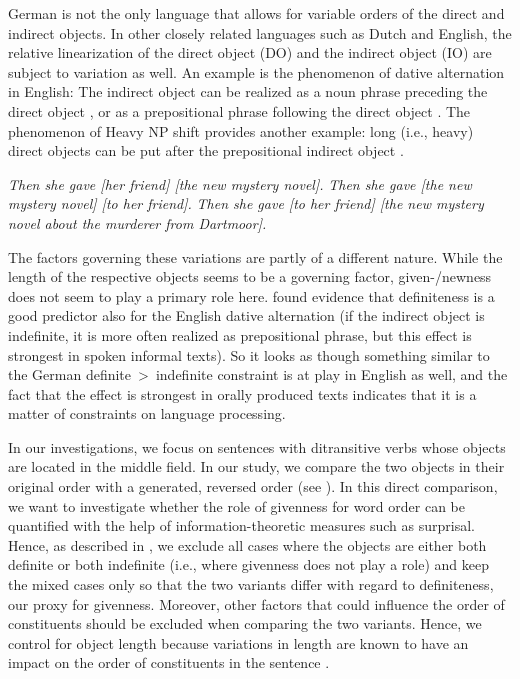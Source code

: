 \documentclass[output=paper,colorlinks,citecolor=brown]{langscibook}
\begin{document}
German is not the only language that allows for variable orders of the direct and indirect objects. In other closely related languages such as Dutch and English, the relative linearization of the direct object (DO) and the indirect object  (IO) are subject to variation as well. An example is the phenomenon of dative alternation in English: The indirect object can be realized as a noun phrase preceding the direct object , or as a prepositional phrase following the direct object . The phenomenon of Heavy NP shift provides another example: long (i.e., heavy) direct objects can be put after the prepositional indirect object .

\ea\label{ex:case-order-english}
  \ea\label{ex:case-order-english-da-oa}
  \emph{Then she gave \emph{[}her friend\emph{]} \emph{[}the new mystery novel\emph{]}.}
%
  \ex\label{ex:case-order-english-oa-PP} 
  \emph{Then she gave \emph{[}the new mystery novel\emph{]} \emph{[}to her friend\emph{]}.}
%
  \ex\label{ex:case-order-english-heavy} 
  \emph{Then she gave \emph{[}to her friend\emph{]} \emph{[}the new mystery novel about the murderer from Dartmoor\emph{]}.}
  \z
\z

The factors governing these variations are partly of a different nature. While the length of the respective objects seems to be a governing factor, given-/newness does not seem to play a primary role here. \citet{engel2022}  found evidence that definiteness is a good predictor also for the English dative alternation (if the indirect object is indefinite, it is more often realized as prepositional phrase, but this effect is strongest in spoken informal texts). So it looks as though something similar to the German definite~>~indefinite constraint is at play in English as well, and the fact that the effect is strongest in orally produced texts indicates that it is a matter of constraints on language processing.

In our investigations, we focus on sentences with ditransitive verbs whose objects are located in the middle field. In our study, we compare the two objects in their original order with a generated, reversed order (see ). In this direct comparison, we want to investigate whether the role of givenness for word order can be quantified with the help of information-theoretic measures such as surprisal. Hence, as described in , we exclude all cases where the objects are either both definite or both indefinite (i.e., where givenness does not play a role) and keep the mixed cases only so that the two variants differ with regard to definiteness, our proxy for givenness. Moreover, other factors that could influence the order of constituents should be excluded when comparing the two variants. Hence, we control for object length because variations in length are known to have an impact on the order of constituents in the sentence \citep[``Gesetz der wachsenden Glieder'', or \emph{law of increasing constituents},][]{Behagel}.
\end{document}
